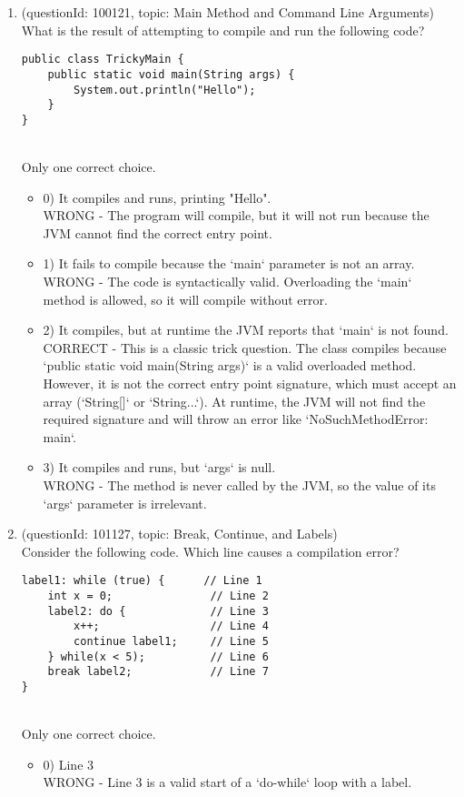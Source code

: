 \documentclass[12pt]{article}
\begin{document}
\begin{enumerate}[label=(\arabic*)]
\begin{itemize}
\end{itemize}
\item (questionId: 100121, topic: Main Method and Command Line Arguments) \\ 
What is the result of attempting to compile and run the following code?
\begin{verbatim}
public class TrickyMain {
    public static void main(String args) {
        System.out.println("Hello");
    }
}
\end{verbatim}
\\ \noindent Only one correct choice. 
\begin{itemize}
\item 0) It compiles and runs, printing "Hello".
 \\ 
WRONG - The program will compile, but it will not run because the JVM cannot find the correct entry point.

\item 1) It fails to compile because the `main` parameter is not an array.
 \\ 
WRONG - The code is syntactically valid. Overloading the `main` method is allowed, so it will compile without error.

\item 2) It compiles, but at runtime the JVM reports that `main` is not found.
 \\ 
CORRECT - This is a classic trick question. The class compiles because `public static void main(String args)` is a valid overloaded method. However, it is not the correct entry point signature, which must accept an array (`String[]` or `String...`). At runtime, the JVM will not find the required signature and will throw an error like `NoSuchMethodError: main`.

\item 3) It compiles and runs, but `args` is null.
 \\ 
WRONG - The method is never called by the JVM, so the value of its `args` parameter is irrelevant.

\end{itemize}
\item (questionId: 101127, topic: Break, Continue, and Labels) \\ 
Consider the following code. Which line causes a compilation error?\n\begin{verbatim}
label1: while (true) {      // Line 1
    int x = 0;               // Line 2
    label2: do {             // Line 3
        x++;                 // Line 4
        continue label1;     // Line 5
    } while(x < 5);          // Line 6
    break label2;            // Line 7
}
\end{verbatim}
\\ \noindent Only one correct choice. 
\begin{itemize}
\item 0) Line 3
 \\ 
WRONG - Line 3 is a valid start of a `do-while` loop with a label.


\end{itemize}
\end{enumerate}
\end{document}
